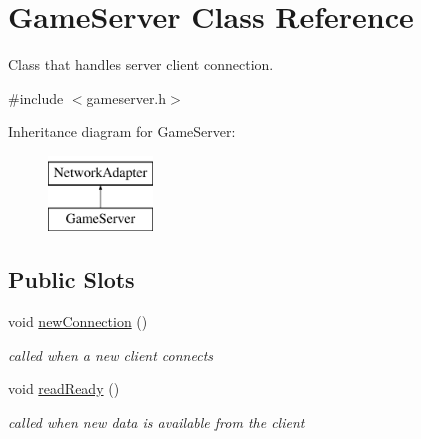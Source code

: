 \hypertarget{classGameServer}{\section{\-Game\-Server \-Class \-Reference}
\label{classGameServer}
}


\-Class that handles server client connection.  




{\ttfamily \#include $<$gameserver.\-h$>$}

\-Inheritance diagram for \-Game\-Server\-:\begin{figure}[H]
\begin{center}
\leavevmode
\includegraphics[height=2.000000cm]{classGameServer}
\end{center}
\end{figure}
\subsection*{\-Public \-Slots}
\begin{DoxyCompactItemize}
\item 
\hypertarget{classGameServer_ae41954b45bd6e4f7cff0b9c9034206cc}{void \hyperlink{classGameServer_ae41954b45bd6e4f7cff0b9c9034206cc}{new\-Connection} ()}\label{classGameServer_ae41954b45bd6e4f7cff0b9c9034206cc}

\begin{DoxyCompactList}\small\item\em called when a new client connects \end{DoxyCompactList}\item 
\hypertarget{classGameServer_ae04551b358465ca81a34073abb7d6380}{void \hyperlink{classGameServer_ae04551b358465ca81a34073abb7d6380}{read\-Ready} ()}\label{classGameServer_ae04551b358465ca81a34073abb7d6380}

\begin{DoxyCompactList}\small\item\em called when new data is available from the client \end{DoxyCompactList}\end{DoxyCompactItemize}
